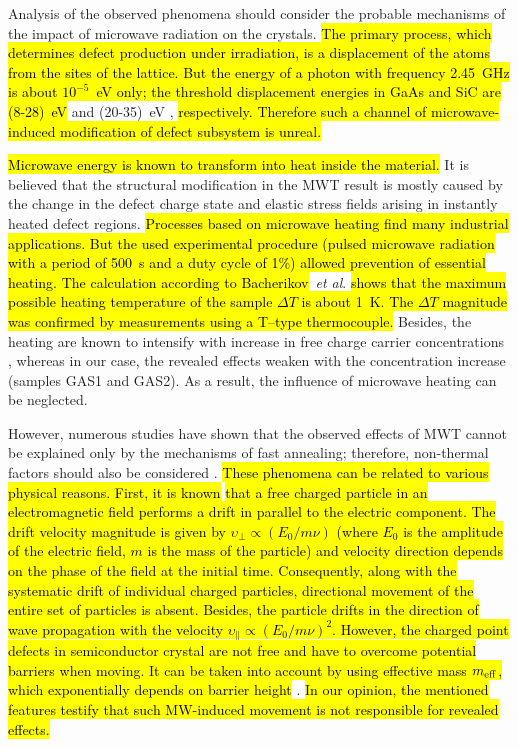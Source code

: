 \documentclass[10pt]{iopart}
\begin{document}
Analysis of the observed phenomena should consider
the probable mechanisms of the impact of microwave radiation on the crystals.
\hl{The primary process, which determines defect production under irradiation,
is a displacement of the atoms from the sites of the lattice.
But the energy of a photon with frequency 2.45~GHz is about $10^{-5}$~eV only;
the threshold displacement energies in GaAs and SiC are (8-28)~eV }\cite{Ed:GaAs} and (20-35)~eV \cite{Ed:SiC},\hl{ respectively.
Therefore such a channel of microwave-induced modification of defect subsystem is unreal.}

\hl{Microwave energy is known to transform into heat inside the material.}
It is believed that the structural modification in the MWT result  is mostly caused by the change
in the defect charge state and elastic stress fields arising in instantly heated defect regions.
\hl{Processes based on microwave heating find many industrial applications.
But the used experimental procedure
(pulsed microwave radiation with a period of 500~s and a duty cycle of 1\%)
allowed prevention of essential heating.
The calculation according to Bacherikov}~\emph{et al}. \cite{Bacherikov2008En}
\hl{shows that
the maximum possible heating temperature of the sample $\Delta T$ is about 1~K.
The $\Delta T$ magnitude was confirmed by measurements using a T--type thermocouple.}
Besides, the heating are known to intensify with increase in free charge carrier concentrations \cite{MW:Rev},
whereas in our case, the revealed effects weaken with the concentration increase (samples GAS1 and GAS2).
As a result, the influence of microwave heating can be neglected.

However, numerous studies have shown that the observed effects of MWT cannot be explained only by the mechanisms of fast  annealing;
therefore, non-thermal factors should also be considered \cite{MW:Si2018,MWT:Rew2001}.
\hl{These phenomena can be related to various physical reasons.
First, it is known} \cite{MW:Force,Milenin:SPQEO2020}
\hl{that a free charged particle in an electromagnetic field
performs a drift in parallel to the electric component.
The drift velocity magnitude is given by $\upsilon_{\bot}\propto (E_0/m \nu)$
(where
$E_0$ is the amplitude of the electric field,
$m$ is the mass of the particle)
and velocity direction depends on the phase
of the field at the initial time.
Consequently, along with the systematic drift of individual charged
particles, directional movement of the entire
set of particles is absent.
Besides, the particle drifts in the direction of
wave propagation with the velocity $\upsilon_\|\propto(E_0/m \nu)^2$.
However, the charged point defects in
semiconductor crystal are not free and
have to overcome potential barriers when moving.
It can be taken into account by using effective
mass $m_{\rm eff}$, which exponentially depends on barrier height} \cite{Milenin:SPQEO2020}.
\hl{In our opinion, the mentioned features testify that
such MW-induced movement is not responsible for revealed effects.}
\end{document}
